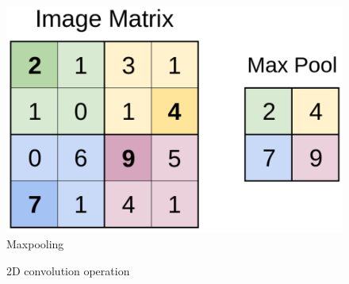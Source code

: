 \begin{figure}[H]
	\centering
	\includegraphics[scale=0.5]{maxpool.png}
	\caption{Maxpooling}
	\label{fig:maxpool}
\end{figure}
\begin{figure}[H]
	\caption{2D convolution operation}
	\label{fig:conv2d}
\end{figure}
